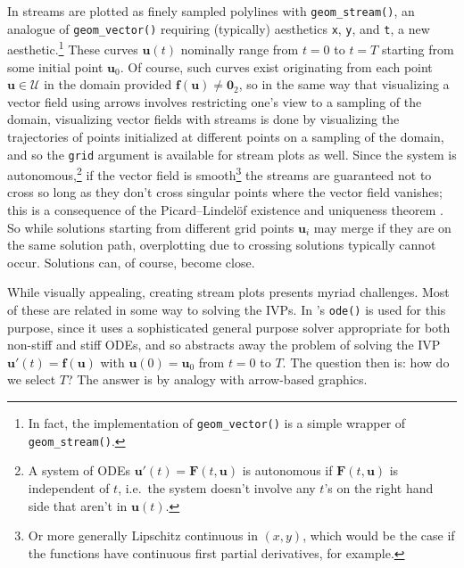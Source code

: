 In  streams are plotted as finely sampled polylines with \texttt{geom\_stream()}, an analogue of \texttt{geom\_vector()} requiring (typically) aesthetics \texttt{x}, \texttt{y}, and \texttt{t}, a new aesthetic.\footnote{In fact, the implementation of \texttt{geom\_vector()} is a simple wrapper of \texttt{geom\_stream()}.} These curves \(\mathbf{u}(t)\) nominally range from \(t = 0\) to \(t = T\) starting from some initial point \(\mathbf{u}_{0}\). Of course, such curves exist originating from each point \(\mathbf{u} \in \mathcal{U}\) in the domain provided \(\mathbf{f}(\mathbf{u}) \neq \mathbf{0}_{2}\), so in the same way that visualizing a vector field using arrows involves restricting one's view to a sampling of the domain, visualizing vector fields with streams is done by visualizing the trajectories of points initialized at different points on a sampling of the domain, and so the \texttt{grid} argument is available for stream plots as well. Since the system is autonomous,\footnote{A system of ODEs \(\mathbf{u}'(t) = \mathbf{F}(t, \mathbf{u})\) is autonomous if \(\mathbf{F}(t, \mathbf{u})\) is independent of \(t\), i.e.~the system doesn't involve any \(t\)'s on the right hand side that aren't in \(\mathbf{u}(t)\).} if the vector field is smooth\footnote{Or more generally Lipschitz continuous in \((x,y)\), which would be the case if the functions have continuous first partial derivatives, for example.} the streams are guaranteed not to cross so long as they don't cross singular points where the vector field vanishes; this is a consequence of the Picard--Lindelöf existence and uniqueness theorem \citep{arnold1973ordinary}. So while solutions starting from different grid points \(\mathbf{u}_{i}\) may merge if they are on the same solution path, overplotting due to crossing solutions typically cannot occur. Solutions can, of course, become close.

While visually appealing, creating stream plots presents myriad challenges. Most of these are related in some way to solving the IVPs. In  's \texttt{ode()} is used for this purpose, since it uses a sophisticated general purpose solver appropriate for both non-stiff and stiff ODEs, and so abstracts away the problem of solving the IVP \(\mathbf{u}'(t) = \mathbf{f}(\mathbf{u})\) with \(\mathbf{u}(0) = \mathbf{u}_{0}\) from \(t = 0\) to \(T\). The question then is: how do we select \(T\)? The answer is by analogy with arrow-based graphics.

